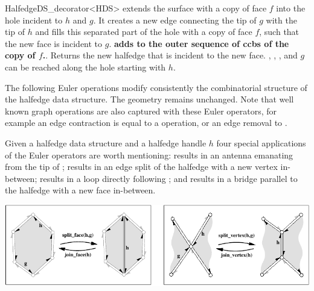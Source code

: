 \begin{ccRefClass}{HalfedgeDS_decorator<HDS>}
   {extends the surface with a copy of face $f$ into the hole 
    incident to $h$ and $g$. It creates a new edge connecting the tip of
    $g$ with the tip of $h$ and fills this separated part of the hole with a
    copy of face $f$, such that the new face is incident to $g$.
    {\bf\ttfamily adds  to the outer sequence of ccbs of the copy of $f$.}.
    Returns the new halfedge that is incident to the new face.
    \ccPrecond {}, ,
    ,  and $g$ can be reached 
    along the hole starting with $h$.}



The following Euler operations modify consistently the combinatorial
structure of the halfedge data structure. The geometry remains unchanged.
Note that well known graph operations are also captured with these 
Euler operators, for example an edge contraction is equal to a
 operation, or an edge removal to .

Given a halfedge data structure  and a halfedge handle $h$
four special applications of the Euler operators are worth mentioning:
 results in an antenna emanating from the tip
of ;  results in an edge 
split of the halfedge  with a new vertex in-between;
 results in a loop directly following ;
and  results in a bridge parallel to
the halfedge  with a new face in-between.

\begin{ccTexOnly}
    \begin{center}
      \parbox{\textwidth}{%
          \includegraphics[width=\textwidth]{HalfedgeDS_ref/fig/euler_hds}%
      }
    \end{center}
\end{ccTexOnly}


\end{ccRefClass}
